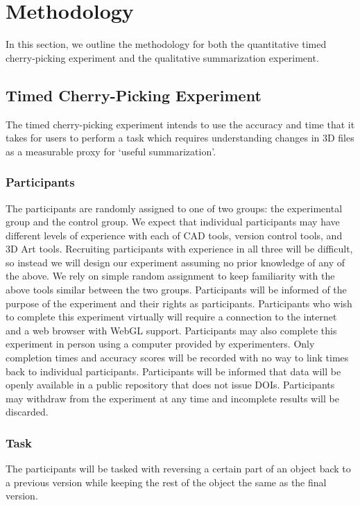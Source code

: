 \documentclass[sigconf,authorversion,nonacm]{acmart}
\begin{document}
\section{Methodology}

In this section, we outline the methodology for both the quantitative timed cherry-picking experiment and the qualitative summarization experiment.

\subsection{Timed Cherry-Picking Experiment}

The timed cherry-picking experiment intends to use the accuracy and time that it takes for users to perform a task which requires understanding changes in 3D files as a measurable proxy for `useful summarization'.

\subsubsection{Participants}

The participants are randomly assigned to one of two groups: the experimental group and the control group.
We expect that individual participants may have different levels of experience with each of CAD tools, version control tools, and 3D Art tools.
Recruiting participants with experience in all three will be difficult, so instead we will design our experiment assuming no prior knowledge of any of the above.
We rely on simple random assignment to keep familiarity with the above tools similar between the two groups.
Participants will be informed of the purpose of the experiment and their rights as participants.
Participants who wish to complete this experiment virtually will require a connection to the internet and a web browser with WebGL support.
Participants may also complete this experiment in person using a computer provided by experimenters.
Only completion times and accuracy scores will be recorded with no way to link times back to individual participants.
Participants will be informed that data will be openly available in a public repository that does not issue DOIs.
Participants may withdraw from the experiment at any time and incomplete results will be discarded.

\subsubsection{Task}

The participants will be tasked with reversing a certain part of an object back to a previous version while keeping the rest of the object the same as the final version.
\end{document}
